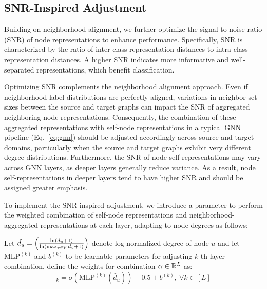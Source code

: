 \subsection{SNR-Inspired Adjustment}
\label{subsec:snr}
Building on neighborhood alignment, we further optimize the signal-to-noise ratio (SNR) of node representations to enhance performance. Specifically, SNR is characterized by the ratio of inter-class representation distances to intra-class representation distances. %
A higher SNR indicates more informative and well-separated representations, which benefit classification.

Optimizing SNR complements the neighborhood alignment approach. Even if neighborhood label distributions are perfectly aligned, variations in neighbor set sizes between the source and target graphs can impact the SNR of aggregated neighboring node representations. Consequently, the combination of these aggregated representations with self-node representations in a typical GNN pipeline (Eq.~\ref{eq:gnn}) should be adjusted accordingly across source and target domains, particularly when the source and target graphs exhibit very different degree distributions. Furthermore, the SNR of node self-representations may vary across GNN layers, as deeper layers generally reduce variance. As a result, node self-representations in deeper layers tend to have higher SNR and should be assigned greater emphasis.


To implement the SNR-inspired adjustment, we introduce a parameter to perform the weighted combination of self-node representations and neighborhood-aggregated representations at each layer, adapting to node degrees as follows:

\begin{definition}
Let $\tilde{d_u}=\left(\frac{\ln(d_u +1)}{\ln(\max_{v\in\mathcal{V}} d_v+1)}\right)$ denote log-normalized degree of node $u$ and let $\text{MLP}^{(k)}$ and $b^{(k)}$ to be learnable parameters for adjusting $k$-th layer combination, define the weights for combination $\alpha \in \mathbb{R}^{L}$ as:
\begin{equation}
    [\alpha]_{k} =
\sigma(\text{MLP}^{(k)}(\tilde{d_u}))-0.5+ b^{(k)}, \: \forall k \in [L]
\label{eq:alpha_ratio}
\end{equation}
\end{definition}

